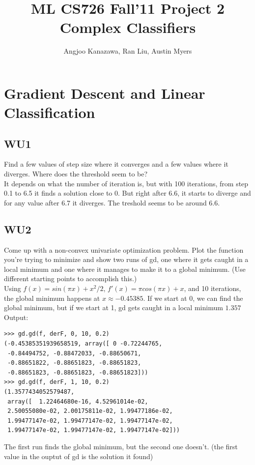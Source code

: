 \documentclass[a4paper,11pt]{article}
\begin{document}
\title{ML CS726 Fall'11 Project 2 Complex Classifiers}
\author{Angjoo Kanazawa, Ran Liu, Austin Myers}
\maketitle


\section{Gradient Descent and Linear Classification}
\subsection{WU1}
\textsf{Find a few values of step size where it converges and a few
  values where it diverges. Where does the threshold seem to be?}\\
It depends on what the number of iteration is, but with 100
iterations, from step 0.1 to 6.5 it finds a solution close to
0. But right after 6.6, it starts to diverge and for any value after
6.7 it diverges. The treshold seems to be around 6.6.

\subsection{WU2}
\textsf{Come up with a non-convex univariate optimization
  problem. Plot the function you're trying to minimize and show two
  runs of gd, one where it gets caught in a local minimum and one
  where it manages to make it to a global minimum. (Use different
  starting points to accomplish this.)}\\
Using $f(x) = sin(\pi x) + x^2/2$, $f'(x) = \pi cos(\pi x) + x$, and
10 iterations, the
global minimum happens at $x\approx -0.45385$.
If we start at 0, we can find the global minimum, but if we start at
1, gd gets caught in a local minimum $1.357$
Output:
\begin{verbatim}
>>> gd.gd(f, derF, 0, 10, 0.2)
(-0.45385351939658519, array([ 0 -0.72244765, 
 -0.84494752, -0.88472033, -0.88650671, 
 -0.88651822, -0.88651823, -0.88651823, 
 -0.88651823, -0.88651823, -0.88651823]))
>>> gd.gd(f, derF, 1, 10, 0.2)
(1.3577434052579487, 
 array([  1.22464680e-16, 4.52961014e-02,
 2.50055080e-02, 2.00175811e-02, 1.99477186e-02, 
 1.99477147e-02, 1.99477147e-02, 1.99477147e-02, 
 1.99477147e-02, 1.99477147e-02, 1.99477147e-02]))
\end{verbatim}
The first run finds the global minimum, but the second one
doesn't. (the first value in the ouptut of gd is the solution it found)
\end{document}
